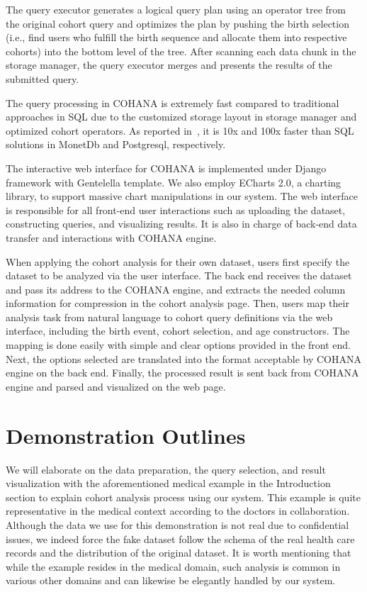The query executor generates a logical query plan using an operator tree from the original cohort query and optimizes the plan by pushing the birth selection (i.e., find users who fulfill the birth sequence and allocate them into respective cohorts) into the bottom level of the tree. After scanning each data chunk in the storage manager, the query executor merges and presents the results of the submitted query.

The query processing in COHANA is extremely fast compared to traditional approaches in SQL due to the customized storage layout in storage manager and optimized cohort operators. As reported in~\cite{jiang2016cohort}, it is 10x and 100x faster than SQL solutions in MonetDb\cite{boncz2005monetdb} and Postgresql\cite{momjian2001postgresql}, respectively.

The interactive web interface for COHANA is implemented under Django\cite{django} framework with Gentelella\cite{gentelella} template. We also employ ECharts 2.0\cite{echarts}, a charting library, to support massive chart manipulations in our system. 
The web interface is responsible for all front-end user interactions such as uploading the dataset, constructing queries, and visualizing results. 
It is also in charge of back-end data transfer and interactions with COHANA engine. 

When applying the cohort analysis for their own dataset, users first specify the dataset to be analyzed via the user interface.
The back end receives the dataset and pass its address to the COHANA engine, and extracts the needed column information for compression in the cohort analysis page. 
Then, users map their analysis task from natural language to cohort query definitions via the web interface, including the birth event, cohort selection, and age constructors.
The mapping is done easily with simple and clear options provided in the front end.
Next, the options selected are translated into the format acceptable by COHANA engine on the back end. Finally, the processed result is sent back from COHANA engine and parsed and visualized on the web page.

\section{Demonstration Outlines}

We will elaborate on the data preparation, the query selection, and result visualization with the aforementioned medical example in the Introduction section to explain cohort analysis process using our system. This example is quite representative in the medical context according to the doctors in collaboration.
Although the data we use for this demonstration is not real due to confidential issues, we indeed force the fake dataset follow the schema of the real health care records and the distribution of the original dataset.
It is worth mentioning that while the example resides in the medical domain, such analysis is common in various other domains and can likewise be elegantly handled by our system.

